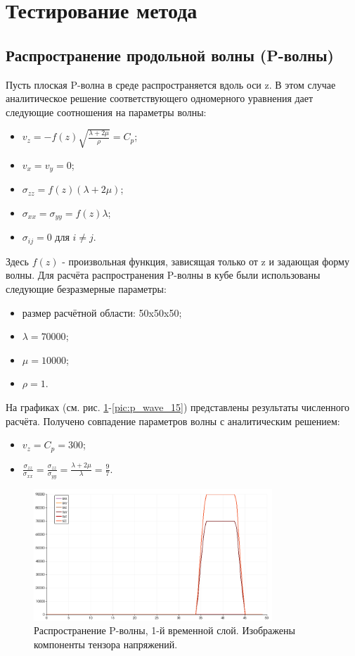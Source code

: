 \section{Тестирование метода}

\subsection{Распространение продольной волны (P-волны)}
Пусть плоская P-волна в среде распространяется вдоль оси z. В этом случае аналитическое решение соответствующего одномерного уравнения дает следующие соотношения на параметры волны:
\begin{itemize}
\item $v_z=-f(z)\sqrt{\frac{\lambda+2\mu}{\rho}}=C_p$;
\item $v_x=v_y=0$;
\item $\sigma_{zz}=f(z)(\lambda+2\mu)$;
\item $\sigma_{xx}=\sigma_{yy}=f(z)\lambda$;
\item $\sigma_{ij}=0$ для $i \neq j$.
\end{itemize}
Здесь $f(z)$ - произвольная функция, зависящая только от z и задающая форму волны.
Для расчёта распространения P-волны в кубе были использованы следующие безразмерные параметры: 
\begin{itemize}
\item размер расчётной области: 50x50x50;
\item $\lambda=70000$;
\item $\mu=10000$;
\item $\rho=1$.
\end{itemize}
На графиках (см. рис.
\ref{pic:p_wave_1}-\ref{pic:p_wave_15}) представлены результаты численного расчёта. Получено совпадение параметров волны с аналитическим решением:
\begin{itemize}
\item $v_z=C_p=300$;
\item $\frac{\sigma_{zz}}{\sigma_{xx}}=\frac{\sigma_{zz}}{\sigma_{yy}}=\frac{\lambda+2\mu}{\lambda}=\frac{9}{7}$.
\end{itemize}

\begin{figure}[htp]
\centering
\includegraphics[width=0.8\textwidth]{png/p-wave-test/s/0001.png}
\caption{Распространение P-волны, 1-й временной слой. Изображены компоненты тензора напряжений.}
\label{pic:p_wave_1}
\end{figure}

